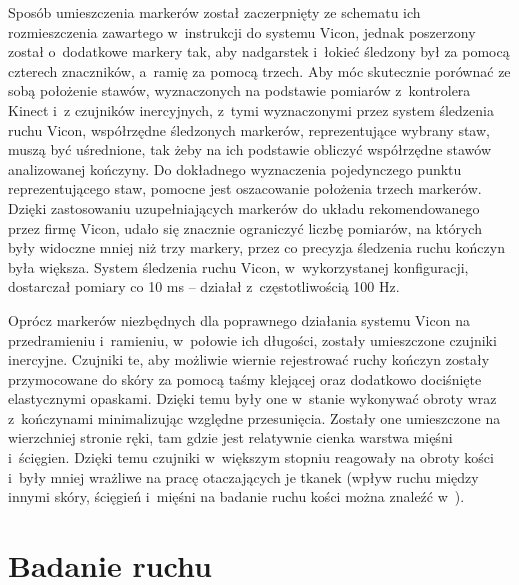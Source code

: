 Sposób umieszczenia markerów został zaczerpnięty ze schematu ich rozmieszczenia zawartego w~instrukcji do systemu Vicon, jednak poszerzony został o~dodatkowe markery tak, aby nadgarstek i~łokieć śledzony był za pomocą czterech znaczników, a~ramię za pomocą trzech. Aby móc skutecznie porównać ze sobą położenie stawów, wyznaczonych na podstawie pomiarów z~kontrolera Kinect i~z czujników inercyjnych, z~tymi wyznaczonymi przez system śledzenia ruchu Vicon, współrzędne śledzonych markerów, reprezentujące wybrany staw, muszą być uśrednione, tak żeby na ich podstawie obliczyć współrzędne stawów analizowanej kończyny. Do dokładnego wyznaczenia pojedynczego punktu reprezentującego staw, pomocne jest oszacowanie położenia trzech markerów. Dzięki zastosowaniu uzupełniających markerów do układu rekomendowanego przez firmę Vicon, udało się znacznie ograniczyć liczbę pomiarów, na których były widoczne mniej niż trzy markery, przez co precyzja śledzenia ruchu kończyn była większa. System śledzenia ruchu Vicon, w~wykorzystanej konfiguracji, dostarczał pomiary co 10 ms -- działał z~częstotliwością 100 Hz.  
				
Oprócz markerów niezbędnych dla poprawnego działania systemu Vicon na przedramieniu i~ramieniu, w~połowie ich długości, zostały umieszczone czujniki inercyjne. Czujniki te, aby możliwie wiernie rejestrować ruchy kończyn zostały przymocowane do skóry za pomocą taśmy klejącej oraz dodatkowo dociśnięte elastycznymi opaskami. Dzięki temu były one w~stanie wykonywać obroty wraz z~kończynami minimalizując względne przesunięcia. Zostały one umieszczone na wierzchniej stronie ręki, tam gdzie jest relatywnie cienka warstwa mięśni i~ścięgien. Dzięki temu czujniki w~większym stopniu reagowały na obroty kości i~były mniej wrażliwe na pracę otaczających je tkanek (wpływ ruchu między innymi skóry, ścięgień i~mięśni na badanie ruchu kości można znaleźć w~\cite{Sati2016,Reinschmidt2016}).
				
\section{Badanie ruchu}
				
